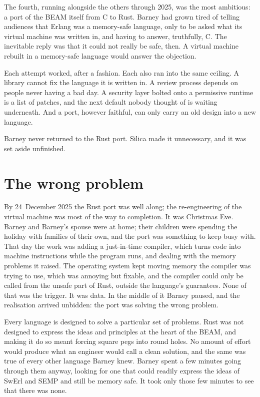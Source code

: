 The fourth, running alongside the others through 2025, was the most ambitious:
a port of the BEAM itself from C to Rust. Barney had grown tired of telling
audiences that Erlang was a memory-safe language, only to be asked what its
virtual machine was written in, and having to answer, truthfully, C. The
inevitable reply was that it could not really be safe, then. A virtual machine
rebuilt in a memory-safe language would answer the objection.

Each attempt worked, after a fashion. Each also ran into the same ceiling.
A library cannot fix the language it is written in. A review process depends on
people never having a bad day. A security layer bolted onto a permissive
runtime is a list of patches, and the next default nobody thought of is
waiting underneath. And a port, however faithful, can only carry an old design
into a new language.


Barney never returned to the Rust port. Silica made it unnecessary, and it was
set aside unfinished.

\section{The wrong problem}

By 24~December 2025 the Rust port was well along; the re-engineering of the
virtual machine was most of the way to completion. It was Christmas Eve. Barney
and Barney's spouse were at home; their children were spending the holiday with
families of their own, and the port was something to keep busy with. That day
the work was adding a just-in-time compiler, which turns code into machine
instructions while the program runs, and dealing with the memory problems it
raised. The operating system kept moving memory the compiler was trying to use,
which was annoying but fixable, and the compiler could only be called from the
unsafe part of Rust, outside the language's guarantees. None of that was the
trigger. It was data. In the middle of it Barney paused, and the realisation
arrived unbidden: the port was solving the wrong problem.

Every language is designed to solve a particular set of problems. Rust was not
designed to express the ideas and principles at the heart of the BEAM, and
making it do so meant forcing square pegs into round holes. No amount of effort
would produce what an engineer would call a clean solution, and the same was
true of every other language Barney knew. Barney spent a few minutes going
through them anyway, looking for one that could readily express the ideas of
SwErl and SEMP and still be memory safe. It took only those few minutes to see
that there was none.

